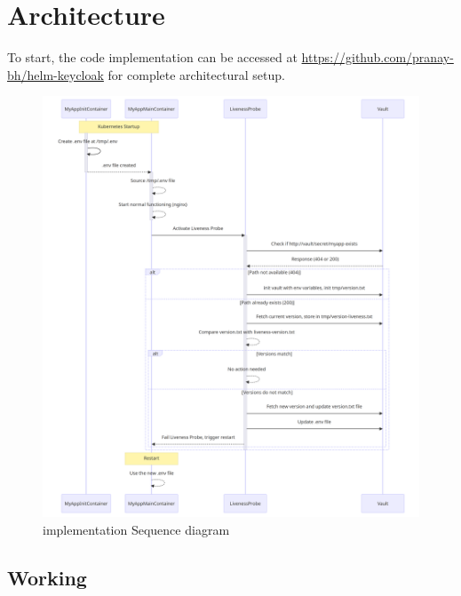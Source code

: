 \section{Architecture}

To start, the code implementation can be accessed at \url{https://github.com/pranay-bh/helm-keycloak} for complete architectural setup.


\begin{figure}[ht]
    \centering
    \includegraphics[width=0.8\linewidth]{figures/seq.png}
    \caption{implementation Sequence diagram}
    \label{fig:Sequence diagram}
\end{figure}


\subsection{Working}

